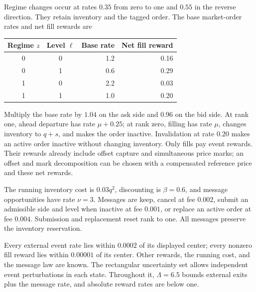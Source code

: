 \documentclass[11pt]{article}
\theoremstyle{plain}
\theoremstyle{definition}
\theoremstyle{remark}
\begin{document}
Regime changes occur at rates \(0.35\) from zero to one and
\(0.55\) in the reverse direction. They retain inventory and the
tagged order. The base market-order rates and net fill rewards are
\begin{center}
\begin{tabular}{@{}ccrr@{}}
\toprule
Regime \(z\)&Level \(\ell\)&Base rate&Net fill reward\\
\midrule
0&0&1.2&0.16\\
0&1&0.6&0.29\\
1&0&2.2&0.03\\
1&1&1.0&0.20\\
\bottomrule
\end{tabular}
\end{center}
Multiply the base rate by \(1.04\) on the ask side and \(0.96\)
on the bid side. At rank one, ahead departure has rate
\(\mu+0.25\); at rank zero, filling has rate \(\mu\), changes
inventory to \(q+s\), and makes the order inactive. Invalidation
at rate \(0.20\) makes an active order inactive without changing
inventory. Only fills pay event rewards. Their rewards already
include offset capture and simultaneous price marks; an offset
and mark decomposition can be chosen with a compensated reference
price and these net rewards.

The running inventory cost is \(0.03q^2\), discounting is
\(\beta=0.6\), and message opportunities have rate \(\nu=3\).
Messages are keep, cancel at fee \(0.002\), submit an admissible
side and level when inactive at fee \(0.001\), or replace an active
order at fee \(0.004\). Submission and replacement reset rank to
one. All messages preserve the inventory reservation.

Every external event rate lies within \(0.0002\) of its displayed
center; every nonzero fill reward lies within \(0.00001\) of its
center. Other rewards, the running cost, and the message law are
known. The rectangular uncertainty set allows independent event
perturbations in each state. Throughout it, \(\Lambda=6.5\) bounds
external exits plus the message rate, and absolute reward rates
are below one.
\end{document}
